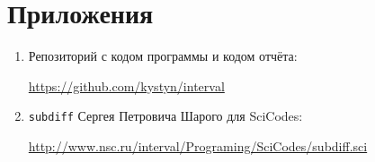 \section{Приложения} \label{app}

\begin{enumerate}
	\item Репозиторий с кодом программы и кодом отчёта:
	
	\href{https://github.com/kystyn/interval}{https://github.com/kystyn/interval}
	
	\item \texttt{subdiff} Сергея Петровича Шарого для SciCodes:
	
	\href{http://www.nsc.ru/interval/Programing/SciCodes/subdiff.sci}{http://www.nsc.ru/interval/Programing/SciCodes/subdiff.sci}	
\end{enumerate}